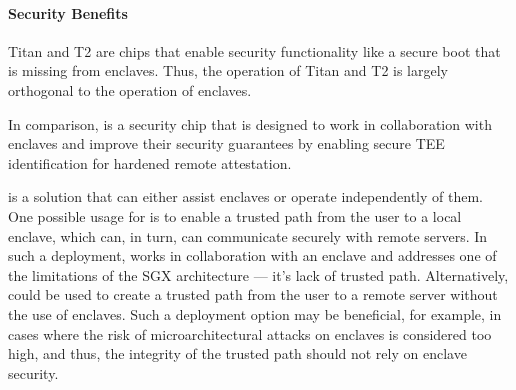 \paragraph{Security Benefits}
Titan and T2 are chips that enable security functionality like a secure boot that is missing from enclaves. Thus, the operation of Titan and T2 is largely orthogonal to the operation of enclaves. 

In comparison, \proximitee is a security chip that is designed to work in collaboration with enclaves and improve their security guarantees by enabling secure TEE identification for hardened remote attestation. 

\protection is a solution that can either assist enclaves or operate independently of them. One possible usage for \protection is to enable a trusted path from the user to a local enclave, which can, in turn, can communicate securely with remote servers. In such a deployment, \protection works in collaboration with an enclave and addresses one of the limitations of the SGX architecture --- it's lack of trusted path. Alternatively, \protection could be used to create a trusted path from the user to a remote server without the use of enclaves. Such a deployment option may be beneficial, for example, in cases where the risk of microarchitectural attacks on enclaves is considered too high, and thus, the integrity of the trusted path should not rely on enclave security.


